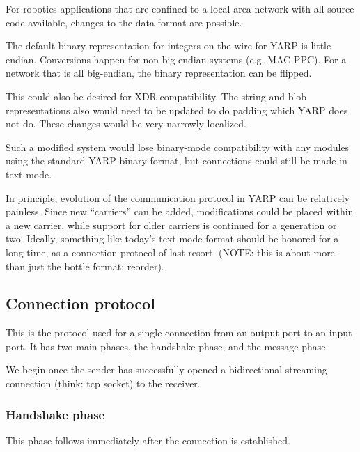 For robotics applications that are confined to a 
local area network with all source code available,
changes to the data format are possible.

The default binary representation for integers on
the wire for YARP is little-endian.  Conversions
happen for non big-endian systems (e.g. MAC PPC).
For a network that is all big-endian,  the 
binary representation can be flipped. 

This could also be desired for XDR compatibility.
The string and blob representations also would
need to be updated to do padding which YARP does
not do.  These changes would be very narrowly
localized.

Such a modified system would lose binary-mode compatibility with any
modules using the standard YARP binary format, but connections could
still be made in text mode.

In principle, evolution of the communication protocol in YARP can be
relatively painless.  Since new ``carriers'' can be added,
modifications could be placed within a new carrier, while support for
older carriers is continued for a generation or two.  Ideally,
something like today's text mode format should be honored for a long
time, as a connection protocol of last resort.
(NOTE: this is about more than just the bottle format; reorder).


\subsection{Connection protocol}

This is the protocol used for a single connection from an output port
to an input port. It has two main phases, the handshake phase,
and the message phase.

We begin once the sender has successfully opened a bidirectional
streaming connection (think: tcp socket) to the receiver.


\subsubsection*{Handshake phase}

This phase follows immediately after the connection is established.

